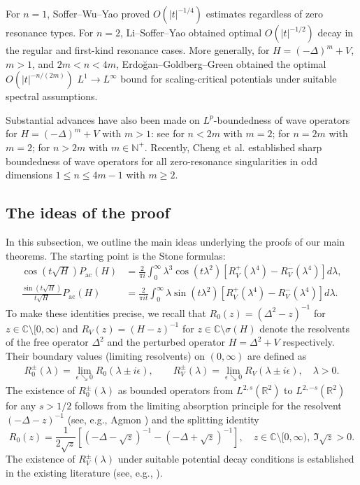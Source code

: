 \documentclass[reqno]{amsart}
\numberwithin{equation}{section}
\begin{document}
For $n=1$, Soffer--Wu--Yao \cite{SWY22} proved $O(|t|^{-1/4})$ estimates regardless of zero resonance types. For $n=2$, Li--Soffer--Yao \cite{LSY21} obtained optimal $O(|t|^{-1/2})$ decay in the regular and first-kind resonance cases. More generally, for \(H=(-\Delta)^m+V\), \(m>1\), and
\(2m<n<4m\), Erdo\u{g}an--Goldberg--Green
\cite{EGG_ArXiv} obtained the optimal
\(O(|t|^{-n/(2m)})\) \(L^1\to L^\infty\) bound for
scaling-critical potentials under suitable spectral assumptions.




Substantial advances have also been made on $L^p$-boundedness of wave operators for $H=(-\Delta)^m+V$ with $m>1$: see \cite{GG21b, MWY22, MWY23, MWY_ArXiv23_2} for $n<2m$ with $m=2$; \cite{Yajima_2024JST} for $n=2m$ with $m=2$; \cite{EG21, Erdogan-Green23, EGG23, EGL} for $n>2m$ with $m\in\mathbb{N}^+$. Recently, Cheng et al. \cite{CSWY25} established sharp boundedness of wave operators for all zero-resonance singularities in odd dimensions $1\le n\le 4m-1$ with $m\ge2$.
\subsection{The ideas of the proof}
In this subsection, we outline the main ideas underlying the proofs of our main theorems.
The starting point is the Stone formulas:
\begin{align*}
	\cos (t \sqrt{H}) P_{\mathrm{ac}}(H) & =\frac{2}{\pi i} \int_0^{\infty} \lambda^3 \cos (t \lambda^2)\left[R_V^{+}(\lambda^4)-R_V^{-}(\lambda^4)\right]  d \lambda, \\
	\frac{\sin (t \sqrt{H})}{t\sqrt{H}} P_{\mathrm{ac}}(H) & =\frac{2}{\pi i t} \int_0^{\infty} \lambda \sin (t \lambda^2)\left[R_V^{+}(\lambda^4)-R_V^{-}(\lambda^4)\right] d \lambda.
\end{align*}
To make these identities precise, we recall that $R_0(z)=(\Delta^2-z)^{-1}$ for $z\in \mathbb{C}\setminus[0,\infty)$ and $R_V(z)=(H-z)^{-1}$ for $z\in \mathbb{C}\setminus\sigma(H)$ denote the resolvents of the free operator $\Delta^2$ and the perturbed operator $H=\Delta^2+V$ respectively.
Their boundary values (limiting resolvents) on $(0,\infty)$ are defined as
\begin{align*}
	R^\pm_0(\lambda)=\lim_{\epsilon \searrow 0}R_0(\lambda\pm i\epsilon ),\qquad  R_V^\pm(\lambda)=\lim_{\epsilon  \searrow 0}R_V(\lambda\pm i\epsilon ),\quad \lambda>0.
\end{align*}
The existence of $R^\pm_0(\lambda)$ as bounded operators from $L^{2,s}(\mathbb{R}^2)$ to $L^{2,-s}(\mathbb{R}^2)$ for any $s>1/2$ follows from the limiting absorption principle for the resolvent $(-\Delta-z)^{-1}$ (see, e.g., Agmon \cite{Agmon}) and the splitting identity
$$
R_0(z)=\frac{1}{2\sqrt z}\left[(-\Delta-\sqrt z)^{-1}-(-\Delta+\sqrt z)^{-1}\right],\quad z\in \mathbb{C}\setminus[0,\infty), \ \Im\sqrt z>0.
$$
The existence of $R^\pm_V(\lambda)$ under suitable potential decay conditions is established in the existing literature (see, e.g., \cite{FSY}).
\end{document}
